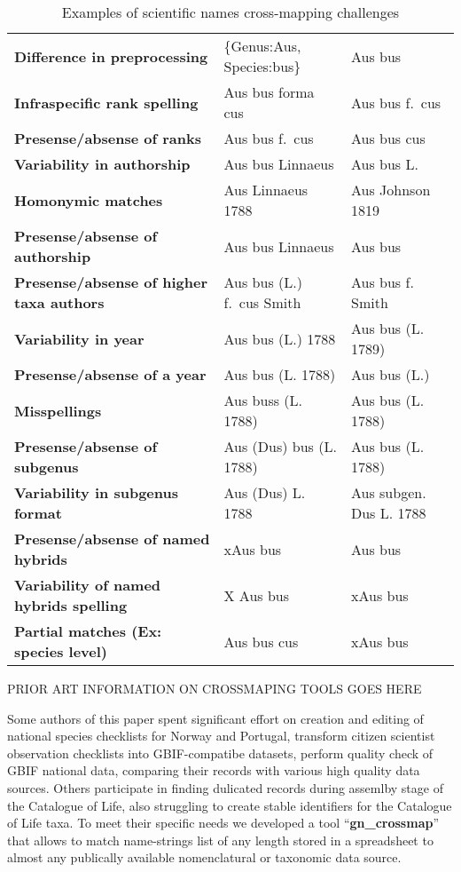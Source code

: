 \documentclass{bmcart}
\begin{document}
\begin{table}[!htb]
  \begin{center}
    \caption{Examples of scientific names cross-mapping challenges
    }\label{table:challanges}
    \begin{tabular}{lll}
    \toprule
    \textbf{Difference in preprocessing} & \{Genus:Aus, Species:bus\} & Aus bus \\
    \textbf{Infraspecific rank spelling} & Aus bus forma cus & Aus bus f.\ cus
    \\
    \textbf{Presense/absense of ranks} & Aus bus f.\ cus & Aus bus cus \\
    \textbf{Variability in authorship} & Aus bus Linnaeus & Aus bus L. \\
    \textbf{Homonymic matches} & Aus Linnaeus 1788 & Aus Johnson 1819 \\
    \textbf{Presense/absense of authorship} & Aus bus Linnaeus & Aus bus \\
    \textbf{Presense/absense of higher taxa authors} & Aus bus (L.) f.\ cus Smith & Aus bus f. Smith \\
    \textbf{Variability in year} & Aus bus (L.) 1788 & Aus bus (L. 1789) \\
    \textbf{Presense/absense of a year} & Aus bus (L. 1788) & Aus bus (L.) \\
    \textbf{Misspellings} & Aus buss (L. 1788) & Aus bus (L. 1788) \\
    \textbf{Presense/absense of subgenus} & Aus (Dus) bus (L. 1788) & Aus bus (L. 1788) \\
    \textbf{Variability in subgenus format} & Aus (Dus) L. 1788 & Aus subgen. Dus L. 1788 \\
    \textbf{Presense/absense of named hybrids} & xAus bus & Aus bus \\
    \textbf{Variability of named hybrids spelling} & X Aus bus & xAus bus \\
    \textbf{Partial matches (Ex: species level)} & Aus bus cus & xAus bus \\
    \bottomrule
    \end{tabular}
  \end{center}
\end{table}

  PRIOR ART INFORMATION ON CROSSMAPING TOOLS GOES HERE

  Some authors of this paper spent significant effort on creation and editing
  of national species checklists for Norway and Portugal, transform citizen
  scientist observation checklists into GBIF-compatibe datasets, perform
  quality check of GBIF national data, comparing their records with various
  high quality data sources. Others participate in finding dulicated records
  during assemlby stage of the Catalogue of Life, also struggling to create
  stable identifiers for the Catalogue of Life taxa.  To meet their specific
  needs we developed a tool ``\textbf{gn\_crossmap}'' that allows to match
  name-strings list of any length stored in a spreadsheet to almost any
  publically available nomenclatural or taxonomic data source.
\end{document}
